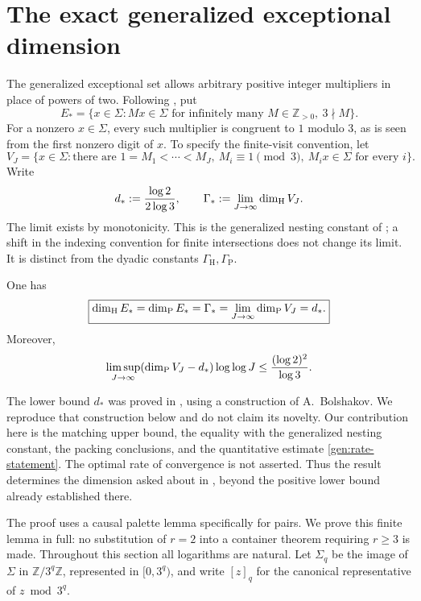\section{The exact generalized exceptional dimension}
\label{gen:section}

The generalized exceptional set allows arbitrary positive integer
multipliers in place of powers of two.  Following
\cite[Definition~1.5]{AL2014}, put
\[
 E_* = \{x\in\Sigma: Mx\in\Sigma\text{ for infinitely many }
                         M\in\mathbb Z_{>0},\ 3\nmid M\}.
\]
For a nonzero $x\in\Sigma$, every such multiplier is congruent to $1$
modulo $3$, as is seen from the first nonzero digit of $x$.
To specify the finite-visit convention, let
\[
 V_J=\{x\in\Sigma:\text{there are }1=M_1<\cdots<M_J,
       \ M_i\equiv1\pmod3,\ M_ix\in\Sigma\text{ for every }i\}.
\]
Write
\[
 d_*:=\frac{\log2}{2\log3},\qquad
 \Gamma_*:=\lim_{J\to\infty}\dim_{\mathrm H} V_J.
\]
The limit exists by monotonicity.  This is the generalized nesting
constant of \cite[(1.14)]{AL2014}; a shift in the indexing convention
for finite intersections does not change its limit.  It is distinct
from the dyadic constants $\Gamma_{\mathrm H},\Gamma_{\mathrm P}$.

\begin{theorem}\label{gen:main}
One has
\[
 \boxed{\dim_{\mathrm H} E_* =\dim_{\mathrm P} E_* =\Gamma_*
       =\lim_{J\to\infty}\dim_{\mathrm P} V_J=d_*.}
\]
Moreover,
\begin{equation}\label{gen:rate-statement}
 \limsup_{J\to\infty}
       (\dim_{\mathrm P} V_J-d_*)\log\log J
       \le \frac{(\log2)^2}{\log3}.
\end{equation}
\end{theorem}

The lower bound $d_*$ was proved in
\cite[Theorems~2.4 and~6.3]{AL2014}, using a construction of
A.~Bolshakov.  We reproduce that construction below and do not claim
its novelty.  Our contribution here is the matching upper bound,
the equality with the generalized nesting constant, the packing
conclusions, and the quantitative estimate
\eqref{gen:rate-statement}.  The optimal rate of convergence is not
asserted.  Thus the result determines the dimension asked about in
\cite[Problem~1.6]{AL2014}, beyond the positive lower bound already
established there.

The proof uses a causal palette lemma specifically for pairs.  We
prove this finite lemma in full: no substitution of $r=2$ into a
container theorem requiring $r\ge3$ is made.  Throughout this section
all logarithms are natural.  Let $\Sigma_q$ be the image of $\Sigma$
in $\mathbb Z/3^q\mathbb Z$, represented in $[0,3^q)$, and write
$[z]_q$ for the canonical representative of $z\bmod3^q$.

